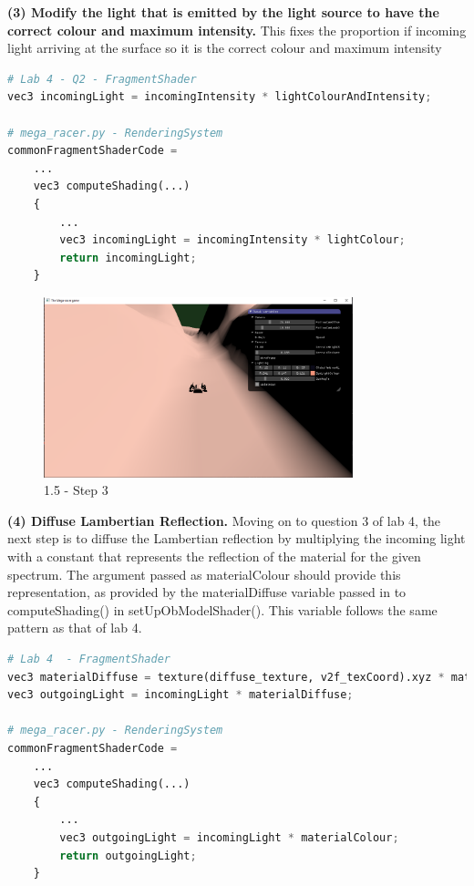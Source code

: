 \documentclass[a4 paper, 12pt]{article}
\begin{document}
\textbf{(3) Modify the light that is emitted by the light source to have the correct colour and maximum intensity.}
This fixes the proportion if incoming light arriving at the surface so it is the correct colour and maximum intensity
    \begin{lstlisting}[language=python] 
# Lab 4 - Q2 - FragmentShader
vec3 incomingLight = incomingIntensity * lightColourAndIntensity;

# mega_racer.py - RenderingSystem
commonFragmentShaderCode =
    ...
    vec3 computeShading(...)
    {
        ...
        vec3 incomingLight = incomingIntensity * lightColour;
        return incomingLight;
    }        
    \end{lstlisting}

    \begin{figure} [H]
        \centering
        \includegraphics[width=0.8\textwidth, frame]
            {./images/1.5_c.PNG}
        \caption{1.5 - Step 3}
    \end{figure}


\textbf{(4) Diffuse Lambertian Reflection.}
Moving on to question 3 of lab 4, the next step is to diffuse the Lambertian reflection by multiplying the incoming light with a constant that represents the reflection of the material for the given spectrum. The argument passed as materialColour should provide this representation, as provided by the materialDiffuse variable passed in to computeShading() in setUpObModelShader(). This variable follows the same pattern as that of lab 4.  
    \begin{lstlisting}[language=python] 
# Lab 4  - FragmentShader
vec3 materialDiffuse = texture(diffuse_texture, v2f_texCoord).xyz * material_diffuse_color;
vec3 outgoingLight = incomingLight * materialDiffuse;

# mega_racer.py - RenderingSystem
commonFragmentShaderCode =
    ...
    vec3 computeShading(...)
    {
        ...
        vec3 outgoingLight = incomingLight * materialColour;
        return outgoingLight;
    }                            
    \end{lstlisting}
\end{document}

